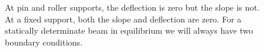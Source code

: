 \documentclass[
  letterpaper,
  DIV=11,
  numbers=noendperiod]{scrreprt}
\theoremstyle{definition}
\theoremstyle{remark}
\begin{document}
\begin{figure}


\caption{\label{fig-11.3}At pin and roller supports, the deflection is
zero but the slope is not. At a fixed support, both the slope and
deflection are zero. For a statically determinate beam in equilibrium we
will always have two boundary conditions.}

\end{figure}%
\end{document}
